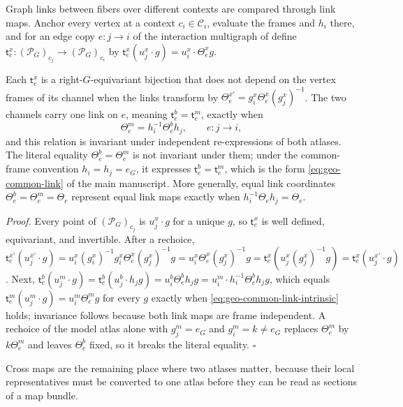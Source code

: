 Graph links between fibers over different contexts are compared through link maps. Anchor every
vertex at a context \(c_i\in\mathcal C_i\), evaluate the frames and \(h_i\) there, and for an edge
copy \(e:j\to i\) of the interaction multigraph of  define
\(\mathsf t_e^x:(\mathscr P_G)_{c_j}\to(\mathscr P_G)_{c_i}\) by
\(\mathsf t_e^x(u_j^x\cdot g)=u_i^x\cdot\Theta_e^xg\).

Each \(\mathsf t_e^x\) is a right-\(G\)-equivariant bijection that does not depend on the vertex
frames of its channel when the links transform by \(\Theta_e^{x\prime}=g_i^x\Theta_e^x(g_j^x)^{-1}\).
The two channels carry one link on \(e\), meaning \(\mathsf t_e^b=\mathsf t_e^m\), exactly when
\begin{equation}
\Theta_e^m=h_i^{-1}\Theta_e^bh_j,
\qquad e:j\to i,
\label{eq:geo-common-link-intrinsic}
\end{equation}
and this relation is invariant under independent re-expressions of both atlases. The literal
equality \(\Theta_e^b=\Theta_e^m\) is not invariant under them; under the common-frame
convention \(h_i=h_j=e_G\), it expresses \(\mathsf t_e^b=\mathsf t_e^m\), which is the form
\eqref{eq:geo-common-link} of the main manuscript. More generally, equal link coordinates
\(\Theta_e^b=\Theta_e^m=\Theta_e\) represent equal link maps exactly when
\(h_i^{-1}\Theta_e h_j=\Theta_e\). 

\noindent\emph{Proof.}
Every point of \((\mathscr P_G)_{c_j}\) is \(u_j^x\cdot g\) for a unique \(g\), so
\(\mathsf t_e^x\) is well defined, equivariant, and invertible. After a rechoice,
\(\mathsf t_e^{x\prime}(u_j^{x\prime}\cdot g)=u_i^x(g_i^x)^{-1}g_i^x\Theta_e^x(g_j^x)^{-1}g
=u_i^x\Theta_e^x(g_j^x)^{-1}g=\mathsf t_e^x(u_j^x(g_j^x)^{-1}g)=\mathsf t_e^x(u_j^{x\prime}\cdot g)\).
Next, \(\mathsf t_e^b(u_j^m\cdot g)=\mathsf t_e^b(u_j^b\cdot h_jg)=u_i^b\Theta_e^bh_jg
=u_i^m\cdot h_i^{-1}\Theta_e^bh_jg\), which equals \(\mathsf t_e^m(u_j^m\cdot g)=u_i^m\Theta_e^mg\)
for every \(g\) exactly when \eqref{eq:geo-common-link-intrinsic} holds; invariance follows
because both link maps are frame independent. A rechoice of the model atlas alone with
\(g_j^m=e_G\) and \(g_i^m=k\neq e_G\) replaces \(\Theta_e^m\) by \(k\Theta_e^m\) and leaves
\(\Theta_e^b\) fixed, so it breaks the literal equality. \hfill$\square$

Cross maps are the remaining place where two atlases matter, because their local representatives
must be converted to one atlas before they can be read as sections of a map bundle.

